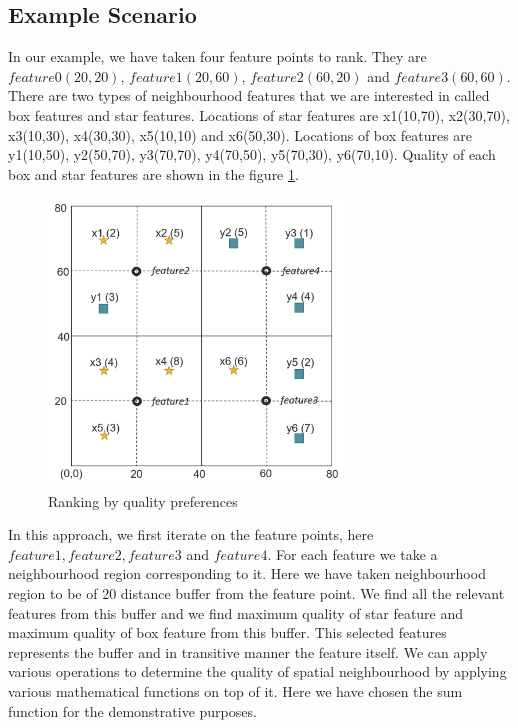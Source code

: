 \subsection{Example Scenario}
\par In our example, we have taken four feature points to rank. They are $feature0(20,20)$, $feature1(20,60)$, $feature2(60,20)$ and $feature3(60,60)$. There are two types of neighbourhood features that we are interested in called box features and star features. Locations of star features are x1(10,70), x2(30,70), x3(10,30), x4(30,30), x5(10,10) and x6(50,30). Locations of box features are y1(10,50), y2(50,70), y3(70,70), y4(70,50), y5(70,30), y6(70,10). Quality of each box and star features are shown in the figure \ref{figure:quality_ranking}.
\newline
\begin{figure}[h]
    \centering
    \includegraphics[width=0.7\textwidth]{pix/p11}
    \caption{Ranking by quality preferences}
    \label{figure:quality_ranking}
\end{figure}
\newline
\par In this approach, we first iterate on the feature points, here $feature1, feature2, feature3$ and $feature4$. For each feature we take a neighbourhood region corresponding to it. Here we have taken neighbourhood region to be of 20 distance buffer from the feature point. We find all the relevant features from this buffer and we find maximum quality of star feature and maximum quality of box feature from this buffer. This selected features represents the buffer and in transitive manner the feature itself. We can apply various operations to determine the quality of spatial neighbourhood by applying various mathematical functions on top of it. Here we have chosen the sum function for the demonstrative purposes.

